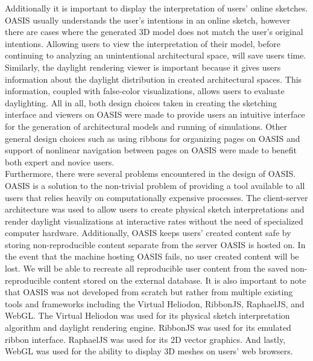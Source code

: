 Additionally it is important to display the interpretation of users' online sketches. OASIS usually understands the user's intentions in an online sketch, however there are cases where the generated 3D model does not match the user's original intentions.  Allowing  users to view the interpretation of their model, before continuing to analyzing an unintentional architectural space, will save users time.  Similarly, the daylight rendering viewer is important because it gives users information about the daylight distribution in created architectural spaces.  This information, coupled with false-color visualizations, allows users to evaluate daylighting. All in all, both design choices taken in creating the  sketching interface and viewers on OASIS were made to provide users an intuitive  interface for the generation of architectural models and running of simulations. Other general design choices such as  using ribbons for organizing pages on OASIS and support of nonlinear navigation between pages on OASIS were made to benefit both expert and novice users. \\ 

Furthermore, there were several problems encountered in the design of OASIS.  OASIS is a solution to the non-trivial problem of providing a tool available to all users that relies heavily on computationally expensive processes. The client-server architecture was used to allow users to create physical sketch interpretations and render daylight visualizations at interactive rates without the need of specialized computer hardware.  Additionally, OASIS keeps users' created content safe by storing non-reproducible content separate from the server OASIS is hosted on. In the event that the machine hosting OASIS fails, no user created content will be lost.  We will be able to recreate all reproducible user content from the saved non-reproducible content stored on the external database.  It is also important to note that OASIS was not developed from scratch but rather from multiple existing tools and frameworks including the Virtual Heliodon, RibbonJS, RaphaelJS, and WebGL.  The Virtual Heliodon was used for its physical sketch interpretation algorithm and daylight rendering engine.  RibbonJS was used for its  emulated ribbon interface.  RaphaelJS was used for its 2D vector graphics.  And lastly,  WebGL was used for the ability to display 3D meshes on users' web browsers.  \\

